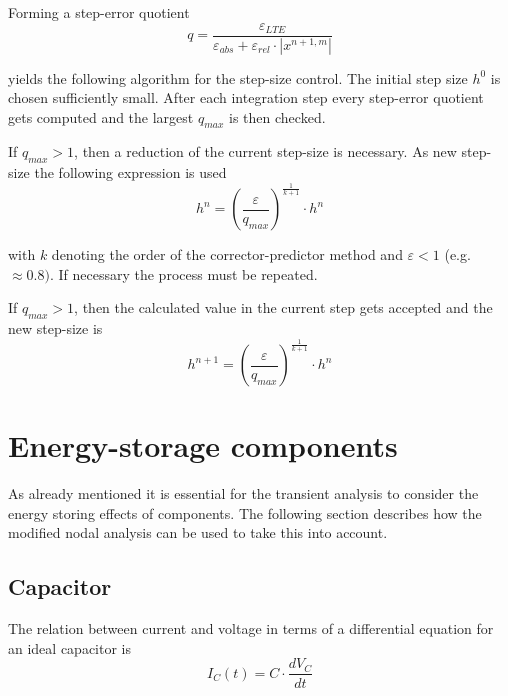 Forming a step-error quotient
\begin{equation}
q = \dfrac{\varepsilon_{LTE}}{\varepsilon_{abs} + \varepsilon_{rel}\cdot \left|x^{n+1,m}\right|}
\end{equation}

yields the following algorithm for the step-size control.  The initial
step size $h^0$ is chosen sufficiently small.  After each integration
step every step-error quotient gets computed and the largest $q_{max}$
is then checked.

\addvspace{12pt}

If $q_{max} > 1$, then a reduction of the current step-size is
necessary.  As new step-size the following expression is used
\begin{equation}
h^n = \left(\dfrac{\varepsilon}{q_{max}}\right)^{\tfrac{1}{k + 1}}\cdot h^n
\end{equation}

with $k$ denoting the order of the corrector-predictor method and
$\varepsilon < 1$ (e.g. $\approx 0.8)$.  If necessary the process must
be repeated.

\addvspace{12pt}

If $q_{max} > 1$, then the calculated value in the current step gets
accepted and the new step-size is
\begin{equation}
h^{n+1} = \left(\dfrac{\varepsilon}{q_{max}}\right)^{\tfrac{1}{k + 1}}\cdot h^n
\end{equation}

\section{Energy-storage components}

As already mentioned it is essential for the transient analysis to
consider the energy storing effects of components.  The following
section describes how the modified nodal analysis can be used to take
this into account.

\subsection{Capacitor}

The relation between current and voltage in terms of a differential
equation for an ideal capacitor is
\begin{equation}
\label{eq:ConstCap}
I_C(t) = C\cdot \dfrac{d V_C}{d t}
\end{equation}

